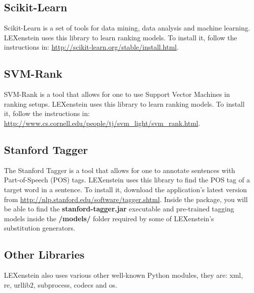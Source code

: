 \subsection{Scikit-Learn}

Scikit-Learn \cite{scikit-learn} is a set of tools for data mining, data analysis and machine learning. LEXenstein uses this library to learn ranking models. To install it, follow the instructions in: \url{http://scikit-learn.org/stable/install.html}.



\subsection{SVM-Rank}

SVM-Rank \cite{svmrank} is a tool that allows for one to use Support Vector Machines in ranking setups. LEXenstein uses this library to learn ranking models. To install it, follow the instructions in: \url{http://www.cs.cornell.edu/people/tj/svm_light/svm_rank.html}.


\subsection{Stanford Tagger}

The Stanford Tagger \cite{Klein1965} is a tool that allows for one to annotate sentences with Part-of-Speech (POS) tags. LEXenstein uses this library to find the POS tag of a target word in a sentence. To install it, download the application's latest version from \url{http://nlp.stanford.edu/software/tagger.shtml}. Inside the package, you will be able to find the \textbf{stanford-tagger.jar} executable and pre-trained tagging models inside the \textbf{/models/} folder required by some of LEXenstein's substitution generators.



\subsection{Other Libraries}

LEXenstein also uses various other well-known Python modules, they are: xml, re, urllib$2$, subprocess, codecs and os.
